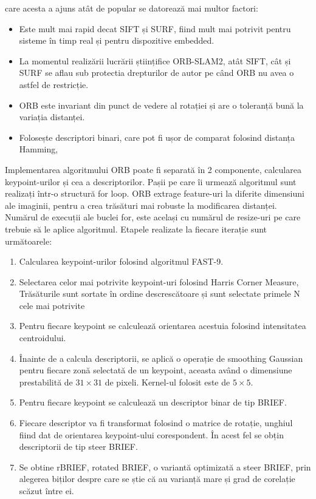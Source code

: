 \documentclass[12pt,a4paper]{report}
\begin{document}
care acesta a ajuns atât de popular se datorează mai multor factori:
\begin{itemize}
    \item Este mult mai rapid decat SIFT și SURF, fiind mult mai potrivit pentru sisteme
în timp real și pentru dispozitive embedded\cite{comparisonsiftsurforb}.
    \item La momentul realizării lucrării științifice ORB-SLAM2, atât SIFT, cât 
și SURF se aflau sub protectia drepturilor de autor pe când ORB nu avea o astfel de restricție.
    \item ORB este invariant din punct de vedere al rotației și are o toleranță bună la variația distanței.   
    \item Folosește descriptori binari, care pot fi ușor de comparat folosind distanța Hamming\cite{hamming1950}, 
\end{itemize}
Implementarea algoritmului ORB poate fi separată în 2 componente, calcularea keypoint-urilor și 
cea a descriptorilor. Pașii pe care îi urmează algoritmul sunt realizați într-o structură for loop.
ORB extrage feature-uri la diferite dimensiuni ale imaginii, pentru a crea trăsături mai
robuste la modificarea distanței. Numărul de execuții ale buclei for, este același cu numărul de 
resize-uri pe care trebuie să le aplice algoritmul. Etapele realizate la fiecare iterație sunt următoarele:   
\begin{enumerate}
    \item Calcularea keypoint-urilor folosind algoritmul FAST-9\cite{fast}.
    \item Selectarea celor mai potrivite keypoint-uri folosind Harris Corner Measure\cite{Harris1988ACC}, Trăsăturile
sunt sortate în ordine descrescătoare și sunt selectate primele N cele mai potrivite
    \item Pentru fiecare keypoint se calculează orientarea acestuia folosind intensitatea centroidului. 
    \item Înainte de a calcula descriptorii, se aplică o operație de smoothing Gaussian pentru fiecare 
zonă selectată de un keypoint, aceasta având o dimensiune prestabilită de $ 31 \times 31 $ de pixeli. Kernel-ul folosit este de $ 5 \times 5 $.
    \item Pentru fiecare keypoint se calculează un descriptor binar de tip BRIEF.\@ 
    \item Fiecare descriptor va fi transformat folosind o matrice de rotație, unghiul fiind dat de orientarea keypoint-ului corespondent.
    În acest fel se obțin descriptorii de tip steer BRIEF\cite{brief}.  
    \item  Se obtine rBRIEF, rotated BRIEF, o variantă optimizată a steer BRIEF, prin alegerea biților
despre care se știe că au varianță mare și grad de corelație scăzut între ei.
\end{enumerate}   
\end{document}
